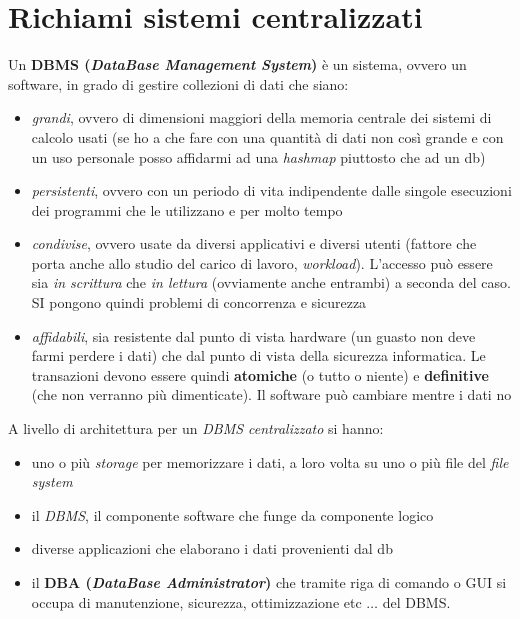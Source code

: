 \section{Richiami sistemi centralizzati}
Un \textbf{DBMS (\textit{DataBase Management System})} è un sistema, ovvero un
  software, in grado di gestire collezioni di dati che siano:
  \begin{itemize}
    \item \textit{grandi}, ovvero di dimensioni maggiori della memoria centrale
    dei sistemi di calcolo usati (se ho a che fare con una quantità di dati non
    così grande e con un uso personale posso affidarmi ad una \textit{hashmap}
    piuttosto che ad un db)
    \item \textit{persistenti}, ovvero con un periodo di vita indipendente dalle
    singole esecuzioni dei programmi che le utilizzano e per molto tempo 
    \item \textit{condivise}, ovvero usate da diversi applicativi e diversi
    utenti (fattore che porta anche allo studio del carico di lavoro,
    \textit{workload}). L'accesso può essere sia \textit{in scrittura} che
    \textit{in lettura} (ovviamente anche entrambi) a seconda del caso. SI
    pongono quindi problemi di concorrenza e sicurezza
    \item \textit{affidabili}, sia resistente dal punto di vista hardware (un
    guasto non deve farmi perdere i dati) che dal punto di vista della sicurezza
    informatica. Le transazioni devono essere quindi \textbf{atomiche} (o tutto
    o niente) e \textbf{definitive} (che non verranno più dimenticate). Il
    software può cambiare mentre i dati no
  \end{itemize}
  
 A livello di architettura per un \textit{DBMS centralizzato} si hanno:
\begin{itemize}
  \item uno o più \textit{storage} per memorizzare i dati, a loro volta su uno o   più file del \textit{file system}
  \item il \textit{DBMS}, il componente software che funge da componente logico
  \item diverse applicazioni che elaborano i dati provenienti dal db 
  \item il \textbf{DBA (\textit{DataBase Administrator})} che tramite riga di
  comando o GUI si occupa di manutenzione, sicurezza, ottimizzazione etc $\ldots$  del DBMS.
\end{itemize}

